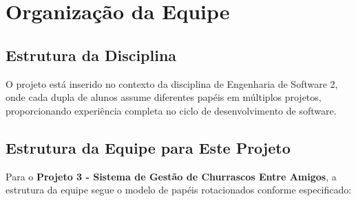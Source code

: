 \section{Organização da Equipe}

\subsection{Estrutura da Disciplina}

O projeto está inserido no contexto da disciplina de Engenharia de Software 2, onde cada dupla de alunos assume diferentes papéis em múltiplos projetos, proporcionando experiência completa no ciclo de desenvolvimento de software.

\subsection{Estrutura da Equipe para Este Projeto}

Para o \textbf{Projeto 3 - Sistema de Gestão de Churrascos Entre Amigos}, a estrutura da equipe segue o modelo de papéis rotacionados conforme especificado:

